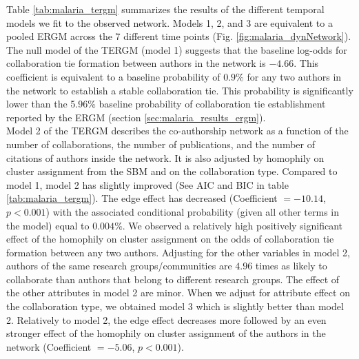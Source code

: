 Table \ref{tab:malaria_tergm} summarizes the results of the different temporal models we fit to the observed network. Models 1, 2, and 3 are equivalent to a pooled ERGM across the 7 different time points (Fig. \ref{fig:malaria_dynNetwork}). The null model of the TERGM (model 1) suggests that the baseline log-odds for collaboration tie formation between authors in the network is $-4.66$. This coefficient is equivalent to a baseline probability of $0.9\%$ for any two authors in the network to establish a stable collaboration tie. This probability is significantly lower than the 5.96\% baseline probability of collaboration tie establishment reported by the ERGM (section \ref{sec:malaria_results_ergm}). \\
Model 2 of the TERGM describes the co-authorship network as a function of the number of collaborations, the number of publications, and the number of citations of authors inside the network. It is also adjusted by homophily on cluster assignment from the SBM and on the collaboration type. Compared to model 1, model 2 has slightly improved (See AIC and BIC in table \ref{tab:malaria_tergm}). The edge effect has decreased (Coefficient $=-10.14$, $p<0.001$) with the associated conditional probability (given all other terms in the model) equal to $0.004\%$. We observed a relatively high positively significant effect of the homophily on cluster assignment on the odds of collaboration tie formation between any two authors. Adjusting for the other variables in model 2, authors of the same research groups/communities are $4.96$ times as likely to collaborate than authors that belong to different research groups. The effect of the other attributes in model 2 are minor. When we adjust for attribute effect on the collaboration type, we obtained model 3 which is slightly better than model 2. Relatively to model 2, the edge effect decreases more followed by an even stronger effect of the homophily on cluster assignment of the authors in the network (Coefficient $=-5.06$, $p<0.001$). \\
